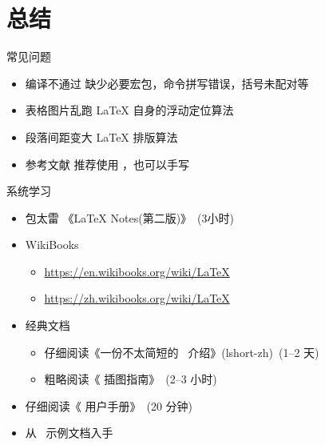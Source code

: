 \section{总结}

\begin{frame}{常见问题}
	\begin{itemize}
		\item \alert{编译不通过} 缺少必要宏包，命令拼写错误，括号未配对等
		\item \alert{表格图片乱跑} \LaTeX{} 自身的浮动定位算法
		\item \alert{段落间距变大} \LaTeX{} 排版算法
		\item \alert{参考文献} 推荐使用 \BibTeX{}，也可以手写 
	\end{itemize}
\end{frame}

\begin{frame}{系统学习}
	\begin{itemize}
      \item 包太雷 《\LaTeX{} Notes(第二版)》~(3小时)
      \item WikiBooks
        \begin{itemize}
          \item \url{https://en.wikibooks.org/wiki/LaTeX}
          \item \url{https://zh.wikibooks.org/wiki/LaTeX}
        \end{itemize}
      \item 经典文档
        \begin{itemize}
          \item 仔细阅读《一份不太简短的~\LaTeXe{} 介绍》(lshort-zh)~(1--2 天)
          \item 粗略阅读《\LaTeXe{} 插图指南》~(2--3 小时)
        \end{itemize}
      \item 仔细阅读《\ThuThesis{} 用户手册》~(20 分钟)
      \item 从~\ThuThesis{} 示例文档入手
	\end{itemize}
\end{frame}

